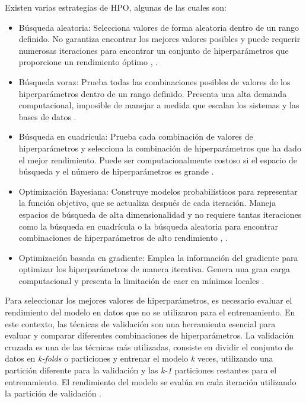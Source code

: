 Existen varias estrategias de HPO, algunas de las cuales son:
\begin{itemize}
	\item Búsqueda aleatoria: Selecciona valores de forma aleatoria dentro de un rango definido. No garantiza encontrar los mejores valores posibles y puede requerir numerosas iteraciones para encontrar un conjunto de hiperparámetros que proporcione un rendimiento óptimo \citep{geron2022hands}, \citep{zoller2021benchmark}.
	\item Búsqueda voraz: Prueba todas las combinaciones posibles de valores de los hiperparámetros dentro de un rango definido. Presenta una alta demanda computacional, imposible de manejar a medida que escalan los sistemas y las bases de datos \citep{zoller2021benchmark}.
	\item Búsqueda en cuadrícula: Prueba cada combinación de valores de hiperparámetros y selecciona la combinación de hiperparámetros que ha dado el mejor rendimiento. Puede ser computacionalmente costoso si el espacio de búsqueda y el número de hiperparámetros es grande \citep{he2021automl}.
	\item Optimización Bayesiana: Construye modelos probabilísticos para representar la función objetivo, que se actualiza después de cada iteración. Maneja espacios de búsqueda de alta dimensionalidad y no requiere tantas iteraciones como la búsqueda en cuadrícula o la búsqueda aleatoria para encontrar combinaciones de hiperparámetros de alto rendimiento \citep{hutter2019automated}, \citep{he2021automl}.
	\item Optimización basada en gradiente: Emplea la información del gradiente para optimizar los hiperparámetros de manera iterativa. Genera una gran carga computacional y presenta la limitación de caer en mínimos locales \citep{zoller2021benchmark}.
\end{itemize} 

Para seleccionar los mejores valores de hiperparámetros, es necesario evaluar el rendimiento del modelo en datos que no se utilizaron para el entrenamiento. En este contexto, las técnicas de validación son una herramienta esencial para evaluar y comparar diferentes combinaciones de hiperparámetros. La validación cruzada es una de las técnicas más utilizadas, consiste en dividir el conjunto de datos en \textit{k-folds} o particiones y entrenar el modelo \textit{k} veces, utilizando una partición diferente para la validación y las \textit{k-1} particiones restantes para el entrenamiento. El rendimiento del modelo se evalúa en cada iteración utilizando la partición de validación \citep{hastie2009elements}. \\

